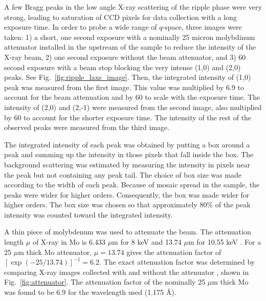A few Bragg peaks in the low angle X-ray scattering of the ripple phase
were very strong, leading to saturation of CCD pixels for data collection
with a long exposure time. 
In order to probe a wide range of $q$-space, three images were taken:
1) a short, one second exposure with a nominally 25 micron 
molybdinum attenuator installed in the upstream of the sample to reduce the intensity
of the X-ray beam, 2) one second exposure without the beam attenuator,
and 3) 60 second exposure with a beam stop blocking the very intense 
(1,0) and (2,0) peaks. See Fig.~\ref{fig:ripple_laxs_image}. 
Then, the integrated intensity of (1,0) peak was measured
from the first image. This value was multiplied by 6.9 to account for the beam
attenuation and by 60 to scale with the exposure time. 
The intensity of (2,0) and (2,-1) were measured from the second image, also
multiplied by 60 to account for the shorter exposure time. The intensity of
the rest of the observed peaks were measured from the third image.

The integrated intensity of each peak was obtained by putting a box around a
peak and summing up the intensity in those pixels that fall inside the box.
The background scattering was estimated by measuring the intensity in pixels
near the peak but not containing any peak tail. The choice of box size was 
made according to the width of each peak. Because of mosaic spread in the sample,
the peaks were wider for higher orders. 
Consequently, the box was made wider for higher
orders. The box size was chosen so that approximately 80\% of the peak intensity
was counted toward the integrated intensity.

A thin piece of molybdenum was used to attenuate the beam. The attenuation length
$\mu$ of X-ray in Mo is 6.433 $\mu$m for 8 keV and 13.74 $\mu$m for 10.55 keV 
\cite{ref:cxro}.
For a 25 $\mu$m thick Mo attenuator, $\mu=13.74$ gives the attenuation factor 
of $[\exp(-25/13.74)]^{-1} = 6.2$. The exact attenuation factor was determined
by comparing X-ray images collected with and without the attenuator
, shown in Fig.~\ref{fig:attenuator}.
The attenuation factor of the nominally 25 $\mu$m thick Mo was found to 
be 6.9 for the wavelength used (1.175 \AA). 


